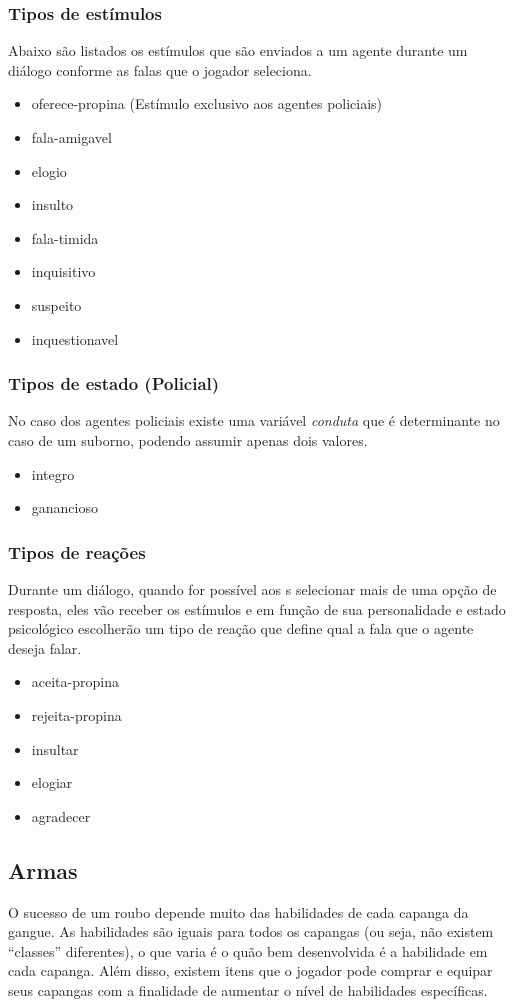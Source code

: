 \subsubsection{Tipos de estímulos}
Abaixo são listados os estímulos que são enviados a um agente durante um diálogo conforme as falas que o jogador seleciona.
\begin{itemize}
\item oferece-propina (Estímulo exclusivo aos agentes policiais)
\item fala-amigavel
\item elogio
\item insulto
\item fala-timida
\item inquisitivo
\item suspeito
\item inquestionavel
\end{itemize}

\subsubsection{Tipos de estado (Policial)}
No caso dos agentes policiais existe uma variável \emph{conduta} que é determinante no caso de um suborno, podendo assumir apenas dois valores.
\begin{itemize}
\item integro
\item ganancioso
\end{itemize}

\subsubsection{Tipos de reações}
Durante um diálogo, quando for possível aos \npc{}s selecionar mais de uma opção de resposta, eles vão receber os estímulos e em função de sua personalidade e estado psicológico escolherão um tipo de reação que define qual a fala que o agente deseja falar.
\begin{itemize}
\item aceita-propina
\item rejeita-propina
\item insultar
\item elogiar
\item agradecer
\end{itemize}


\subsection{Armas}
O sucesso de um roubo depende muito das habilidades de cada capanga da gangue. As habilidades são iguais para todos os capangas (ou seja, não existem ``classes'' diferentes), o que varia é o quão bem desenvolvida é a habilidade em cada capanga. Além disso, existem itens que o jogador pode comprar e equipar seus capangas com a finalidade de aumentar o nível de habilidades específicas.

